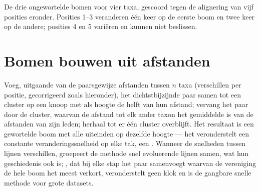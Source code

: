\begin{omfigure}

{\small De drie ongewortelde bomen voor vier taxa, gescoord tegen de
alignering van vijf posities eronder. Posities 1--3 veranderen één keer op de
eerste boom en twee keer op de andere; posities 4 en 5 variëren en kunnen niet
beslissen.}
\end{omfigure}

\section{Bomen bouwen uit afstanden}

\begin{method}\label{meth:b2:phylogenetic-trees:upgma}
Voeg, uitgaande van de paarsgewijze afstanden tussen $n$ taxa (verschillen per
positie, gecorrigeerd zoals hieronder), het dichtstbijzijnde paar samen tot een
cluster op een knoop met als hoogte de helft van hun afstand; vervang het paar
door de cluster, waarvan de afstand tot elk ander taxon het gemiddelde is van
de afstanden van zijn leden; herhaal tot er één cluster overblijft. Het
resultaat is een gewortelde boom met alle uiteinden op dezelfde hoogte --- het
veronderstelt een constante veranderingssnelheid op elke tak, een . Wanneer de snelheden tussen lijnen verschillen, groepeert de methode snel
evoluerende lijnen samen, wat hun geschiedenis ook is; \emph{},
dat bij elke stap het paar samenvoegt waarvan de vereniging de hele boom het
meest verkort, veronderstelt geen klok en is de gangbare snelle methode
voor grote datasets.
\end{method}

